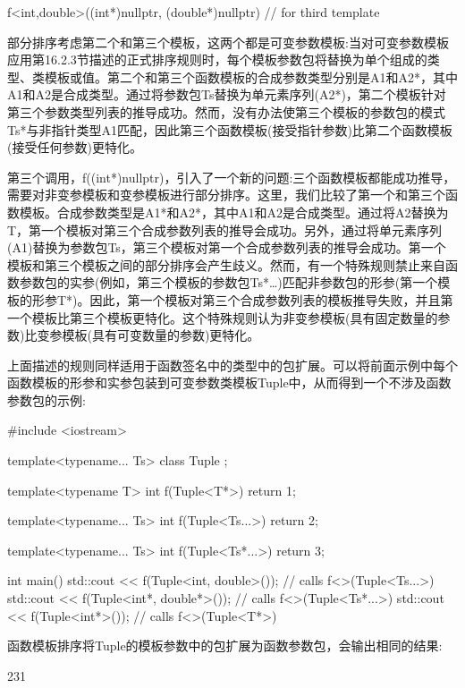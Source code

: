 \begin{cpp}
f<int,double>((int*)nullptr, (double*)nullptr) // for third template
\end{cpp}

部分排序考虑第二个和第三个模板，这两个都是可变参数模板:当对可变参数模板应用第16.2.3节描述的正式排序规则时，每个模板参数包将替换为单个组成的类型、类模板或值。第二个和第三个函数模板的合成参数类型分别是A1和A2*，其中A1和A2是合成类型。通过将参数包Ts替换为单元素序列(A2*)，第二个模板针对第三个参数类型列表的推导成功。然而，没有办法使第三个模板的参数包的模式Ts*与非指针类型A1匹配，因此第三个函数模板(接受指针参数)比第二个函数模板(接受任何参数)更特化。

第三个调用，f((int*)nullptr)，引入了一个新的问题:三个函数模板都能成功推导，需要对非变参模板和变参模板进行部分排序。这里，我们比较了第一个和第三个函数模板。合成参数类型是A1*和A2*，其中A1和A2是合成类型。通过将A2替换为T，第一个模板对第三个合成参数列表的推导会成功。另外，通过将单元素序列(A1)替换为参数包Ts，第三个模板对第一个合成参数列表的推导会成功。第一个模板和第三个模板之间的部分排序会产生歧义。然而，有一个特殊规则禁止来自函数参数包的实参(例如，第三个模板的参数包Ts*…)匹配非参数包的形参(第一个模板的形参T*)。因此，第一个模板对第三个合成参数列表的模板推导失败，并且第一个模板比第三个模板更特化。这个特殊规则认为非变参模板(具有固定数量的参数)比变参模板(具有可变数量的参数)更特化。

上面描述的规则同样适用于函数签名中的类型中的包扩展。可以将前面示例中每个函数模板的形参和实参包装到可变参数类模板Tuple中，从而得到一个不涉及函数参数包的示例:

\begin{cpp}
#include <iostream>

template<typename... Ts> class Tuple
{
};

template<typename T>
int f(Tuple<T*>)
{
	return 1;
}

template<typename... Ts>
int f(Tuple<Ts...>)
{
	return 2;
}

template<typename... Ts>
int f(Tuple<Ts*...>)
{
	return 3;
}

int main()
{
	std::cout << f(Tuple<int, double>()); // calls f<>(Tuple<Ts...>)
	std::cout << f(Tuple<int*, double*>()); // calls f<>(Tuple<Ts*...>)
	std::cout << f(Tuple<int*>()); // calls f<>(Tuple<T*>)
}
\end{cpp}

函数模板排序将Tuple的模板参数中的包扩展为函数参数包，会输出相同的结果:

\begin{shell}
231
\end{shell}





















